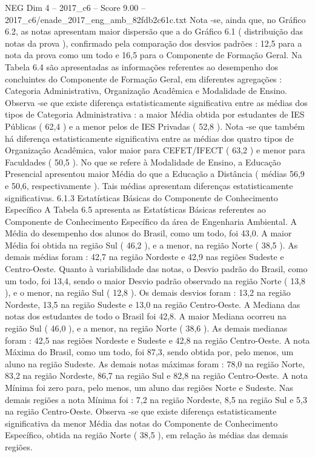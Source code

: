 \begin{textsample}{NEG Dim 4 – 2017\_c6 – Score 9.00 – 2017\_c6/enade\_2017\_eng\_amb\_82fdb2c61c.txt}
Nota -se, ainda que, no Gráfico 6.2, as notas apresentam maior dispersão que a do Gráfico 6.1 ( distribuição das notas da prova ), confirmado pela comparação dos desvios padrões : 12,5 para a nota da prova como um todo e 16,5 para o Componente de Formação Geral.
Na Tabela 6.4 são apresentadas as informações referentes ao desempenho dos concluintes do Componente de Formação Geral, em diferentes agregações : Categoria Administrativa, Organização Acadêmica e Modalidade de Ensino.
Observa -se que existe diferença estatisticamente significativa entre as médias dos tipos de Categoria Administrativa : a maior Média obtida por estudantes de IES Públicas ( 62,4 ) e a menor pelos de IES Privadas ( 52,8 ).
Nota -se que também há diferença estatisticamente significativa entre as médias dos quatro tipos de Organização Acadêmica, valor maior para CEFET/IFECT ( 63,2 ) e menor para Faculdades ( 50,5 ).
No que se refere à Modalidade de Ensino, a Educação Presencial apresentou maior Média do que a Educação a Distância ( médias 56,9 e 50,6, respectivamente ).
Tais médias apresentam diferenças estatisticamente significativas. 6.1.3 Estatísticas Básicas do Componente de Conhecimento Específico A Tabela 6.5 apresenta as Estatísticas Básicas referentes ao Componente de Conhecimento Específico da área de Engenharia Ambiental.
A Média do desempenho dos alunos do Brasil, como um todo, foi 43,0.
A maior Média foi obtida na região Sul ( 46,2 ), e a menor, na região Norte ( 38,5 ).
As demais médias foram : 42,7 na região Nordeste e 42,9 nas regiões Sudeste e Centro-Oeste.
Quanto à variabilidade das notas, o Desvio padrão do Brasil, como um todo, foi 13,4, sendo o maior Desvio padrão observado na região Norte ( 13,8 ), e o menor, na região Sul ( 12,8 ).
Os demais desvios foram : 13,2 na região Nordeste, 13,5 na região Sudeste e 13,0 na região Centro-Oeste.
A Mediana das notas dos estudantes de todo o Brasil foi 42,8.
A maior Mediana ocorreu na região Sul ( 46,0 ), e a menor, na região Norte ( 38,6 ).
As demais medianas foram : 42,5 nas regiões Nordeste e Sudeste e 42,8 na região Centro-Oeste.
A nota Máxima do Brasil, como um todo, foi 87,3, sendo obtida por, pelo menos, um aluno na região Sudeste.
As demais notas máximas foram : 78,0 na região Norte, 83,2 na região Nordeste, 86,7 na região Sul e 82,8 na região Centro-Oeste.
A nota Mínima foi zero para, pelo menos, um aluno das regiões Norte e Sudeste.
Nas demais regiões a nota Mínima foi : 7,2 na região Nordeste, 8,5 na região Sul e 5,3 na região Centro-Oeste.
Observa -se que existe diferença estatisticamente significativa da menor Média das notas do Componente de Conhecimento Específico, obtida na região Norte ( 38,5 ), em relação às médias das demais regiões.

\end{textsample}
